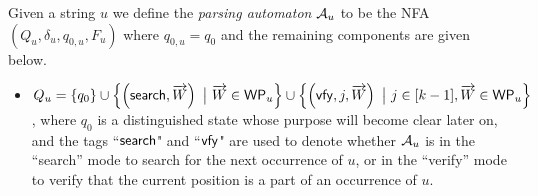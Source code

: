 \begin{definition}
Given a string $u$ we define the \emph{parsing automaton} $\mathcal{A}_u$ to be the NFA $(Q_u, \delta_u, q_{0,u}, F_u)$ where $q_{0,u}=q_0$ and the remaining components are given below.
\begin{itemize}
	\item  $Q_u =\left\{q_0 \right\} \cup \left\{ \left(\mathsf{search}, \overrightarrow{W} \right)\ \big\vert\ \overrightarrow{W} \in \mathsf{WP}_{u} \right\} \cup  \left\{ \left(\mathsf{vfy}, j, \overrightarrow{W} \right) \ \big\vert\ j \in [k-1], \overrightarrow{W} \in \mathsf{WP}_{u} \right\}$, where $q_0$ is a distinguished state whose purpose will become clear later on,  and the tags ``$\mathsf{search}$" and ``$\mathsf{vfy}$" are used to denote whether $\mathcal{A}_u$ is in the ``search'' mode to search for the next occurrence of $u$, or in the ``verify'' mode to verify that the current position is a part of an occurrence of $u$.


\end{itemize}
\end{definition}
